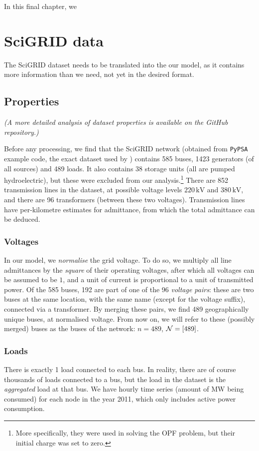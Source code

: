 \documentclass[main.tex]{subfiles}
\begin{document}
In this final chapter, we 

\section{SciGRID data}
The SciGRID dataset needs to be translated into the our model, as it contains more information than we need, not yet in the desired format. 

\subsection{Properties}
\emph{(A more detailed analysis of dataset properties is available on the GitHub repository.)}

Before any processing, we find that the SciGRID network (obtained from \texttt{PyPSA} example code, the exact dataset used by \cite{Nesti2018emergentfailures}) contains 585 buses, 1423 generators (of all sources) and 489 loads. It also contains 38 storage units (all are pumped hydroelectric), but these were excluded from our analysis.\footnote{More specifically, they were used in solving the OPF problem, but their initial charge was set to zero.} There are 852 transmission lines in the dataset, at possible voltage levels $220 \, \si{\kilo\volt}$ and $380 \, \si{\kilo\volt}$, and there are 96 transformers (between these two voltages). Transmission lines have per-kilometre estimates for admittance, from which the total admittance can be deduced.

\subsubsection{Voltages}
In our model, we \emph{normalise} the grid voltage. To do so, we multiply all line admittances by the \emph{square} of their operating voltages, after which all voltages can be assumed to be $1$, and a unit of current is proportional to a unit of transmitted power. Of the 585 buses, 192 are part of one of the 96 \emph{voltage pairs}: these are two buses at the same location, with the same name (except for the voltage suffix), connected via a transformer. By merging these pairs, we find 489 geographically unique buses, at normalised voltage. From now on, we will refer to these (possibly merged) buses as the buses of the network: $n=489$, $\mathcal{N} = [489]$.

\subsubsection{Loads}
There is exactly 1 load connected to each bus. In reality, there are of course thousands of loads connected to a bus, but the load in the dataset is the \emph{aggregated} load at that bus. We have hourly time series (\ie amount of $\si{\mega\watt}$ being consumed) for each node in the year 2011, which only includes active power consumption.
\end{document}
